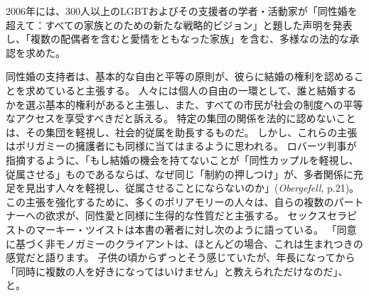 \documentclass[paper=a4,book,openany]{jlreq}
\newcommand{\ig}[1]{}           %
\begin{document}
2006年には、300人以上のLGBTおよびその支援者の学者・活動家が「同性婚を超えて：すべての家族とのための新たな戦略的ビジョン」と題した声明を発表し、「複数の配偶者を含むと愛情をともなった家族」を含む、多様なの法的な承認を求めた\citep{MR06:_beyon_same_sex_marriag}。

同性婚の支持者は、基本的な自由と平等の原則が、彼らに結婚の権利を認めることを求めていると主張する。
人々には個人の自由の一環として、誰と結婚するかを選ぶ基本的権利があると主張し、また、すべての市民が社会の制度への平等なアクセスを享受すべきだと訴える。
特定の集団の関係を法的に認めないことは、その集団を軽視し、社会的従属を助長するものだ。
しかし、これらの主張はポリガミーの擁護者にも同様に当てはまるように思われる。
ロバーツ判事\ig{John Roberts}が指摘するように、「もし結婚の機会を持てないことが「同性カップルを軽視し、従属させる」ものであるならば、なぜ同じ「制約の押しつけ」が、多者関係に充足を見出す人々を軽視し、従属させることにならないのか」(\emph{Obergefell}, p.21)。
この主張を強化するために、多くのポリアモリーの人々は、自らの複数のパートナーへの欲求が、同性愛と同様に生得的な性質だと主張する。
セックスセラピストのマーキー・ツイストは本書の著者に対し次のように語っている。
「同意に基づく非モノガミーのクライアントは、ほとんどの場合、これは生まれつきの感覚だと語ります。
子供の頃からずっとそう感じていたが、年長になってから「同時に複数の人を好きになってはいけません」と教えられただけなのだ」、と\citep{mcarthur16:_why_peopl_are_fight_get}。
\end{document}
